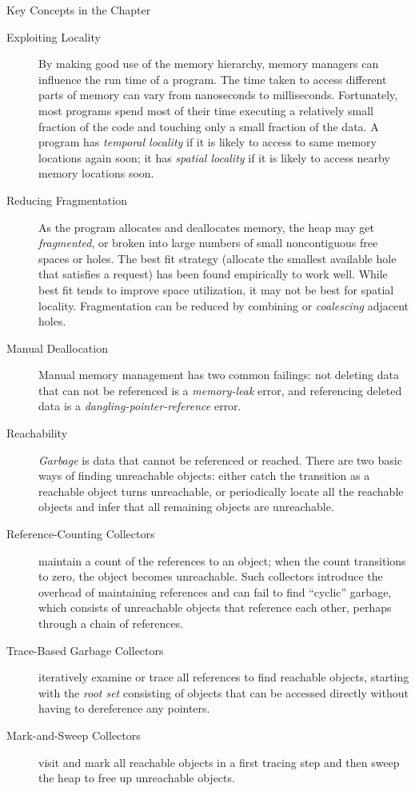 \begin{bibunit}[apalike]
\begin{frame}[t,allowframebreaks]{Key Concepts in the Chapter}
\begin{small}
\begin{description}
	\item[Exploiting Locality] By making good use of the memory hierarchy, memory managers can influence the run time of a program. The time taken to access different parts of memory can vary from nanoseconds to milliseconds. Fortunately, most programs spend most of their time executing a relatively small fraction of the code and touching only a small fraction of the data. A program has \emph{temporal locality} if it is likely to access to same memory locations again soon; it has \emph{spatial locality} if it is likely to access nearby memory locations soon.
	\item[Reducing Fragmentation] As the program allocates and deallocates memory, the heap may get \emph{fragmented}, or broken into large numbers of small noncontiguous free spaces or holes. The best fit strategy (allocate the smallest available hole that satisfies a request) has been found empirically to work well. While best fit tends to improve space utilization, it may not be best for spatial locality. Fragmentation can be reduced by combining or \emph{coalescing} adjacent holes.
	\item[Manual Deallocation] Manual memory management has two common failings: not deleting data that can not be referenced is a \emph{memory-leak} error, and referencing deleted data is a \emph{dangling-pointer-reference} error.
	\item[Reachability] \emph{Garbage} is data that cannot be referenced or reached. There are two basic ways of finding unreachable objects: either catch the transition as a reachable object turns unreachable, or periodically locate all the reachable objects and infer that all remaining objects are unreachable.
	\item[Reference-Counting Collectors] maintain a count of the references to an object; when the count transitions to zero, the object becomes unreachable. Such collectors introduce the overhead of maintaining references and can fail to find ``cyclic'' garbage, which consists of unreachable objects that reference each other, perhaps through a chain of references.
	\item[Trace-Based Garbage Collectors] iteratively examine or trace all references to find reachable objects, starting with the \emph{root set} consisting of objects that can be accessed directly without having to dereference any pointers.
	\item[Mark-and-Sweep Collectors] visit and mark all reachable objects in a first tracing step and then sweep the heap to free up unreachable objects.

\end{description}
\end{small}
\end{frame}
\end{bibunit}
